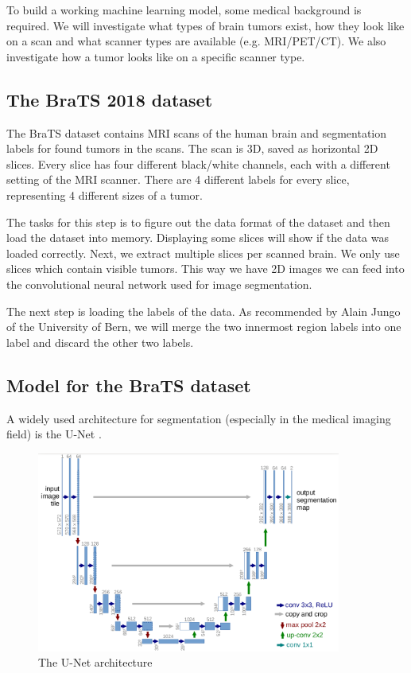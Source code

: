 To build a working machine learning model, some medical background is required. We will investigate what types of brain tumors exist, how they look like on a scan and what scanner types are available (e.g. MRI/PET/CT). We also investigate how a tumor looks like on a specific scanner type.

\subsection{The BraTS 2018 dataset}
The BraTS \cite{menze2015multimodal} dataset contains MRI scans of the human brain and segmentation labels for found tumors in the scans.
The scan is 3D, saved as horizontal 2D slices. Every slice has four different black/white channels, each with a different setting of the MRI scanner.
There are 4 different labels for every slice, representing 4 different sizes of a tumor.

The tasks for this step is to figure out the data format of the dataset and then load the dataset into memory. Displaying some slices will show if the data was loaded correctly. Next, we extract multiple slices per scanned brain. We only use slices which contain visible tumors. This way we have 2D images we can feed into the convolutional neural network used for image segmentation.

The next step is loading the labels of the data. As recommended by Alain Jungo of the University of Bern, we will merge the two innermost region labels into one label and discard the other two labels.

\subsection{Model for the BraTS dataset}
A widely used architecture for segmentation (especially in the medical imaging field) is the U-Net \cite{ronneberger2015u}.

\begin{figure}[H]
\centering
\caption{The U-Net architecture}
\includegraphics[width=10cm]{images/unet.png}
\end{figure}

